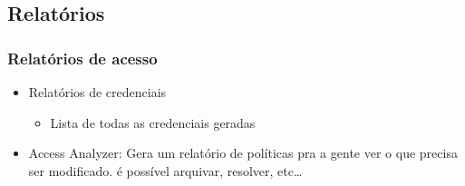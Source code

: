 \subsection{Relatórios}

\begin{frame}
	\frametitle{Relatórios de acesso}
	\begin{itemize}
		\item Relatórios de credenciais
			\begin{itemize}
				\item Lista de todas as credenciais geradas
			\end{itemize}
		\item Access Analyzer: Gera um relatório de políticas pra a gente ver o que precisa ser modificado. é possível arquivar, resolver, etc\dots
	\end{itemize}
\end{frame}
